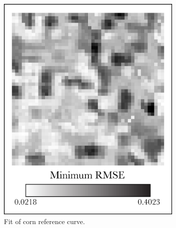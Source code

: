 \begin{figure}
  \centering
  \begin{subfigure}[b]{.45\textwidth}
    \includegraphics[width=\textwidth]{Graphics/corn1_edited.png}
    \caption{Fit of corn reference curve.}
    \label{subfig:corn1}
  \end{subfigure}
  \quad
  \begin{subfigure}[b]{.45\textwidth}

\end{subfigure}
\end{figure}
